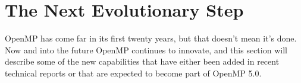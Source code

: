 \section{The Next Evolutionary Step}
\label{sec:in_progress}

OpenMP has come far in its first twenty years, but that doesn't mean it's done.
Now and into the future OpenMP continues to innovate, and this section will
describe some of the new capabilities that have either been added in recent
technical reports or that are expected to become part of OpenMP 5.0.








   

